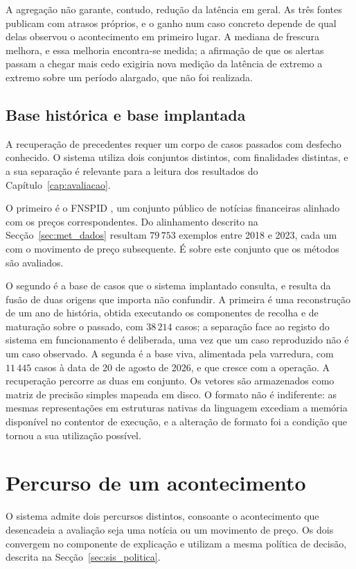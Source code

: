 A agregação não garante, contudo, redução da latência em geral. As três fontes publicam com
atrasos próprios, e o ganho num caso concreto depende de qual delas observou o acontecimento em
primeiro lugar. A mediana de frescura melhora, e essa melhoria encontra-se medida; a afirmação de
que os alertas passam a chegar mais cedo exigiria nova medição da latência de extremo a extremo
sobre um período alargado, que não foi realizada.

\subsection{Base histórica e base implantada}
\label{sec:sis_bases}

A recuperação de precedentes requer um corpo de casos passados com desfecho conhecido. O sistema
utiliza dois conjuntos distintos, com finalidades distintas, e a sua separação é relevante para a
leitura dos resultados do Capítulo~\ref{cap:avaliacao}.

O primeiro é o \gls{FNSPID} \autocite{dong2024fnspid}, um conjunto público de notícias financeiras
alinhado com os preços correspondentes. Do alinhamento descrito na Secção~\ref{sec:met_dados}
resultam $79\,753$ exemplos entre 2018 e 2023, cada um com o movimento de preço subsequente. É
sobre este conjunto que os métodos são avaliados.

O segundo é a base de casos que o sistema implantado consulta, e resulta da fusão de duas origens
que importa não confundir. A primeira é uma reconstrução de um ano de história, obtida executando os
componentes de recolha e de maturação sobre o passado, com $38\,214$ casos; a separação face ao
registo do sistema em funcionamento é deliberada, uma vez que um caso reproduzido não é um caso
observado. A segunda é a base viva, alimentada pela varredura, com $11\,445$ casos à data
de 20 de agosto de 2026, e que cresce com a operação. A recuperação
percorre as duas em conjunto. Os vetores são armazenados como matriz de precisão simples mapeada em disco. O
formato não é indiferente: as mesmas representações em estruturas nativas da linguagem excediam a
memória disponível no contentor de execução, e a alteração de formato foi a condição que tornou a
sua utilização possível.

\section{Percurso de um acontecimento}
\label{sec:sis_percurso}

O sistema admite dois percursos distintos, consoante o acontecimento que desencadeia a avaliação
seja uma notícia ou um movimento de preço. Os dois convergem no componente de explicação e
utilizam a mesma política de decisão, descrita na Secção~\ref{sec:sis_politica}.

